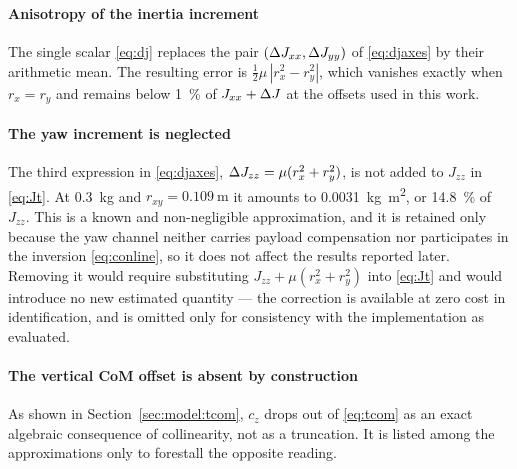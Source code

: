 \paragraph{Anisotropy of the inertia increment} The single scalar
\eqref{eq:dj} replaces the pair $(\Delta J_{xx}, \Delta J_{yy})$ of
\eqref{eq:djaxes} by their arithmetic mean. The resulting error is
$\tfrac{1}{2}\mu\,|r_x^2 - r_y^2|$, which vanishes exactly when
$r_x = r_y$ and remains below \SI{1}{\percent} of $J_{xx} + \Delta J$ at the
offsets used in this work.

\paragraph{The yaw increment is neglected} The third expression in
\eqref{eq:djaxes}, $\Delta J_{zz} = \mu(r_x^2 + r_y^2)$, is not added to
$J_{zz}$ in \eqref{eq:Jt}. At \SI{0.3}{\kg} and
$r_{xy} = \SI{0.109}{\meter}$ it amounts to
\SI{0.0031}{\kg\meter\squared}, or \SI{14.8}{\percent} of $J_{zz}$. This
is a known and non-negligible approximation, and it is retained only
because the yaw channel neither carries payload compensation nor
participates in the inversion \eqref{eq:conline}, so it does not affect
the results reported later. Removing it would require substituting
$J_{zz} + \mu(r_x^2 + r_y^2)$ into \eqref{eq:Jt} and would introduce no
new estimated quantity --- the correction is available at zero cost in
identification, and is omitted only for consistency with the
implementation as evaluated.

\paragraph{The vertical CoM offset is absent by construction} As shown in
Section~\ref{sec:model:tcom}, $c_z$ drops out of \eqref{eq:tcom} as an
exact algebraic consequence of collinearity, not as a truncation. It is
listed among the approximations only to forestall the opposite reading.
